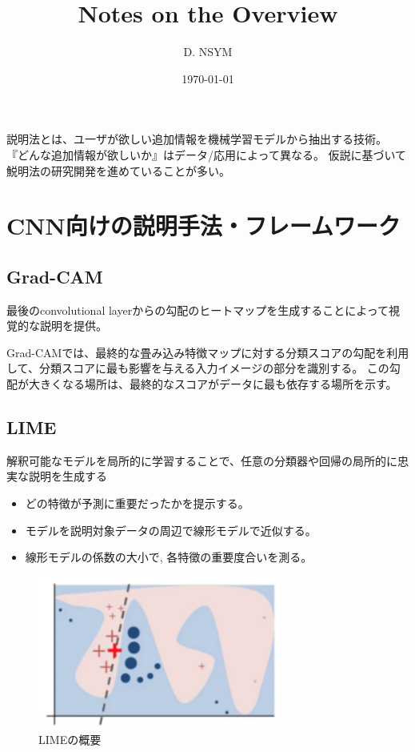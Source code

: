 \documentclass[a4paper,10pt]{ltjsarticle}
\title{Notes on the Overview}
\author{D. NSYM}
\date{\today}
\newcommand{\1}{\mbox{1}\hspace{-0.25em}\mbox{l}}
\theoremstyle{definition}
\begin{document}
    \maketitle

    説明法とは、ユ一ザが欲しい追加情報を機械学習モデルから抽出する技術。
    『どんな追加情報が欲しいか』はデータ/応用によって異なる。
    仮説に基づいて鮵明法の研究開発を進めていることが多い。


    \section{CNN向けの説明手法・フレームワーク}

    \subsection{Grad-CAM\cite{selvaraju2017grad}}

    最後のconvolutional layerからの勾配のヒートマップを生成することによって視覚的な説明を提供。

    Grad-CAMでは、最終的な畳み込み特徴マップに対する分類スコアの勾配を利用して、分類スコアに最も影響を与える入力イメージの部分を識別する。
    この勾配が大きくなる場所は、最終的なスコアがデータに最も依存する場所を示す。

    \subsection{LIME\cite{ribeiro2016should}}

    解釈可能なモデルを局所的に学習することで、任意の分類器や回帰の局所的に忠実な説明を生成する
    \begin{itemize}
        \item どの特徴が予測に重要だったかを提示する。
        \item モデルを説明対象データの周辺で線形モデルで近似する。
        \item 線形モデルの係数の大小で, 各特徵の重要度合いを測る。
    \end{itemize}
    \begin{figure}[H]
        \centering
        \includegraphics[width=80mm]{fig/lime}
        \caption{LIMEの概要}
    \end{figure}
\end{document}
